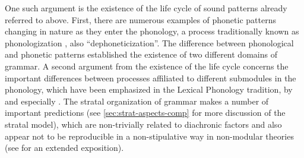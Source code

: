 One such argument is the existence of the life cycle of sound patterns already referred to above. First, there are numerous examples of phonetic patterns changing in nature as they enter the phonology, a process traditionally known as phonologization \citep[\egm][]{hyman76:_phonol,barnesbook,kingston07}, \cf also  \enquote{dephoneticization}. The difference between phonological and phonetic patterns established the existence of two different domains of grammar. A second argument from the existence of the life cycle concerns the important differences between processes affiliated to different submodules in the phonology, which have been emphasized in the Lexical Phonology tradition, \eg by \citet{kiparsky95,mcmahon00:_lexic_phonol_englis,kaisse11:_lexic_phonol} and especially \citet[\eg][]{bermudez-diachr,bermudez-otero10:_curren_englis,bermudez-oterong}. The stratal organization of grammar makes a number of important predictions (see \cref{sec:strat-aspects-comp} for more discussion of the stratal model), which are non\hyp trivially related to diachronic factors and also appear not to be reproducible in a non\hyp stipulative way in non\hyp modular theories (see \citealt{bermudez-oterong} for an extended exposition).


